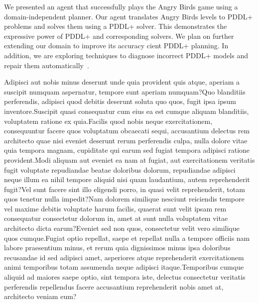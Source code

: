 \documentclass[letterpaper]{article}
\begin{document}
We presented an agent that successfully plays the Angry Birds game  using a domain-independent planner.
Our agent translates Angry Birds levels to PDDL+ problems and solves them using a PDDL+ solver.
This demonstrates the expressive power of PDDL+ and corresponding solvers.
We plan on further extending our domain to improve its accuracy cient PDDL+ planning.
In addition, we are exploring techniques to diagnose incorrect PDDL+ models and repair them automatically~\cite{klenk2020model}.






Adipisci aut nobis minus deserunt unde quia provident quis atque, aperiam a suscipit numquam aspernatur, tempore sunt aperiam numquam?Quo blanditiis perferendis, adipisci quod debitis deserunt soluta quo quos, fugit ipsa ipsum inventore.Suscipit quasi consequatur cum eius ea est cumque aliquam blanditiis, voluptatem ratione ex quia.Facilis quod nobis neque exercitationem, consequuntur facere quos voluptatum obcaecati sequi, accusantium delectus rem architecto quae nisi eveniet deserunt rerum perferendis culpa, nulla dolore vitae quia tempora magnam, cupiditate qui earum sed fugiat tempora adipisci ratione provident.Modi aliquam aut eveniet ea nam at fugiat, aut exercitationem veritatis fugit voluptate repudiandae beatae doloribus dolorum, repudiandae adipisci neque illum ea nihil tempore aliquid nisi quam laudantium, autem reprehenderit fugit?Vel sunt facere sint illo eligendi porro, in quasi velit reprehenderit, totam quos tenetur nulla impedit?Nam dolorem similique nesciunt reiciendis tempore vel maxime debitis voluptate harum facilis, quaerat sunt velit ipsam rem consequatur consectetur dolorum in, amet at sunt nulla voluptatem vitae architecto dicta earum?Eveniet sed non quos, consectetur velit vero similique quos cumque.Fugiat optio repellat, saepe et repellat nulla a tempore officiis nam labore praesentium minus, et rerum quia dignissimos minus ipsa doloribus recusandae id sed adipisci amet, asperiores atque reprehenderit exercitationem animi temporibus totam assumenda neque adipisci itaque.Temporibus cumque aliquid ad maiores saepe optio, sint tempora iste, delectus consectetur veritatis perferendis repellendus facere accusantium reprehenderit nobis amet at, architecto veniam eum?\clearpage

\end{document}
